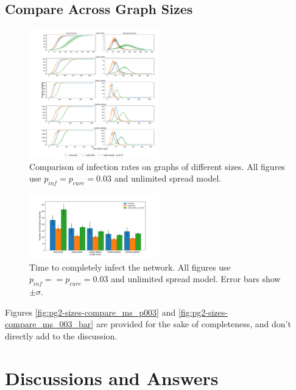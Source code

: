 \documentclass[conference]{IEEEtran}
\begin{document}
\subsection{Compare Across Graph Sizes}


\begin{figure}[htb]
  \begin{center}
	\includegraphics[width=0.5\textwidth]{img/pg1-sizes-compare_ms_p003.pdf}
  \end{center}
	\caption{Comparison of infection rates on graphs of different sizes. All figures use $p_{inf} = p_{cure} =  0.03$ and unlimited spread model.}
	\label{fig:pg2-sizes-compare_ms_p003}
\end{figure}

\begin{figure}[htb]
  \begin{center}
	\includegraphics[width=0.5\textwidth]{img/pg1-sizes-compare_ms_003_bar.pdf}
  \end{center}
	\caption{Time to completely infect the network. All figures use $p_{inf} =  = p_{cure} = 0.03$ and unlimited spread model. Error bars show $\pm \sigma$.}
	\label{fig:pg2-sizes-compare_ms_003_bar}
\end{figure}

Figures \autoref{fig:pg2-sizes-compare_ms_p003} and \autoref{fig:pg2-sizes-compare_ms_003_bar} are provided for the sake of completeness, and don't directly add to the discussion.

\section{Discussions and Answers}\label{sec:disc-answers}
\end{document}

